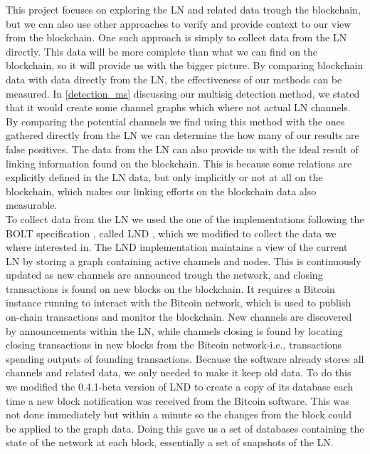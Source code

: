 This project focuses on exploring the LN and related data trough the blockchain, but we can also use other approaches to verify and provide context to our view from the blockchain.
One such approach is simply to collect data from the LN directly.
This data will be more complete than what we can find on the blockchain, so it will provide us with the bigger picture. By comparing blockchain data with data directly from the LN, the effectiveness of our methods can be measured. In \cref{detection_ms} discussing our multisig detection method, we stated that it would create some channel graphs which where not actual LN channels. By comparing the potential channels we find using this method with the ones gathered directly from the LN we can determine the how many of our results are false positives.
The data from the LN can also provide us with the ideal result of linking information found on the blockchain. This is because some relations are explicitly defined in the LN data, but only implicitly or not at all on the blockchain, which makes our linking efforts on the blockchain data also measurable.
\\

To collect data from the LN we used the one of the implementations following the BOLT specification \cite{bolt}, called LND \cite{lnd}, which we modified to collect the data we where interested in. The LND implementation maintains a view of the current LN by storing a graph containing active channels and nodes. This is continuously updated as new channels are announced trough the network, and closing transactions is found on new blocks on the blockchain. It requires a Bitcoin instance running to interact with the Bitcoin network, which is used to publish on-chain transactions and monitor the blockchain. New channels are discovered by announcements within the LN, while channels closing is found by locating closing transactions in new blocks from the Bitcoin network-i.e., transactions spending outputs of founding transactions. 
Because the software already stores all channels and related data, we only needed to make it keep old data.
To do this we modified the 0.4.1-beta version of LND to create a copy of its database each time a new block notification was received from the Bitcoin software. This was not done immediately but within a minute so the changes from the block could be applied to the graph data. Doing this gave us a set of databases containing the state of the network at each block, essentially a set of snapshots of the LN.
\\


